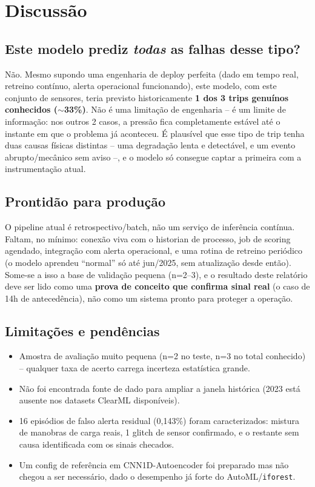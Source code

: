 \documentclass[11pt,a4paper]{article}
\begin{document}
\section{Discussão}

\subsection{Este modelo prediz \emph{todas} as falhas desse tipo?}

Não. Mesmo supondo uma engenharia de deploy perfeita (dado em tempo real,
retreino contínuo, alerta operacional funcionando), este modelo, com este
conjunto de sensores, teria previsto historicamente \textbf{1 dos 3 trips
genuínos conhecidos ($\sim$33\%)}. Não é uma limitação de engenharia -- é
um limite de informação: nos outros 2 casos, a pressão fica completamente
estável até o instante em que o problema já aconteceu. É plausível que
esse tipo de trip tenha duas causas físicas distintas -- uma degradação
lenta e detectável, e um evento abrupto/mecânico sem aviso --, e o modelo
só consegue captar a primeira com a instrumentação atual.

\subsection{Prontidão para produção}

O pipeline atual é retrospectivo/batch, não um serviço de inferência
contínua. Faltam, no mínimo: conexão viva com o historian de processo,
job de scoring agendado, integração com alerta operacional, e uma rotina
de retreino periódico (o modelo aprendeu ``normal'' só até jun/2025, sem
atualização desde então). Some-se a isso a base de validação pequena
(n=2--3), e o resultado deste relatório deve ser lido como uma
\textbf{prova de conceito que confirma sinal real} (o caso de 14h de
antecedência), não como um sistema pronto para proteger a operação.

\subsection{Limitações e pendências}

\begin{itemize}[leftmargin=1.4em]
  \item Amostra de avaliação muito pequena (n=2 no teste, n=3 no total
  conhecido) -- qualquer taxa de acerto carrega incerteza estatística
  grande.
  \item Não foi encontrada fonte de dado para ampliar a janela histórica
  (2023 está ausente nos datasets ClearML disponíveis).
  \item 16 episódios de falso alerta residual (0,143\%) foram
  caracterizados: mistura de manobras de carga reais, 1 glitch de sensor
  confirmado, e o restante sem causa identificada com os sinais checados.
  \item Um config de referência em CNN1D-Autoencoder foi preparado mas não
  chegou a ser necessário, dado o desempenho já forte do AutoML/\texttt{iforest}.
\end{itemize}
\end{document}
